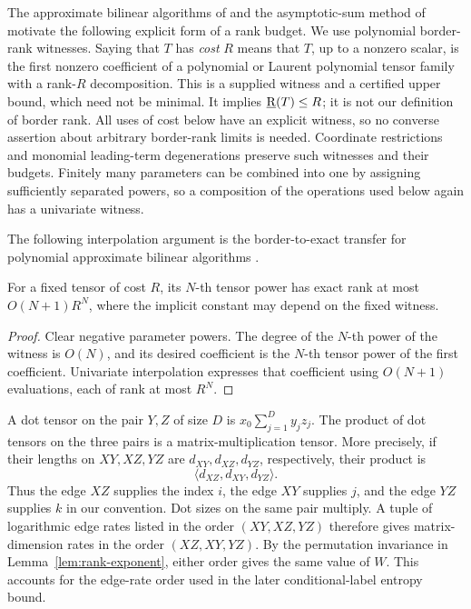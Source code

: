 The approximate bilinear algorithms of \citet{bini} and the
asymptotic-sum method of \citet{schonhage} motivate the following
explicit form of a rank budget.  We use polynomial border-rank witnesses.
Saying that \(T\) has \emph{cost} \(R\) means that \(T\), up to a nonzero
scalar, is the first nonzero coefficient of a polynomial or Laurent
polynomial tensor family with a rank-\(R\) decomposition.
This is a supplied witness and a certified upper bound, which need not
be minimal.  It implies \(\operatorname{\underline R}(T)\le R\); it is not our definition of
border rank.  All uses of cost below have an explicit witness, so no
converse assertion about arbitrary border-rank limits is needed.
Coordinate restrictions and monomial leading-term degenerations preserve
such witnesses and their budgets.  Finitely many parameters can be
combined into one by assigning sufficiently separated powers, so a
composition of the operations used below again has a univariate witness.

The following interpolation argument is the border-to-exact transfer
for polynomial approximate bilinear algorithms \cite{bini}.

\begin{lemma}\label{lem:border-overhead}
For a fixed tensor of cost \(R\), its \(N\)-th tensor power has exact
rank at most \(O(N+1)R^N\), where the implicit constant may depend on
the fixed witness.
\end{lemma}

\begin{proof}
Clear negative parameter powers.
The degree of the \(N\)-th power of the witness is \(O(N)\), and its
desired coefficient is the \(N\)-th tensor power of the first
coefficient.  Univariate interpolation expresses that coefficient using
\(O(N+1)\) evaluations, each of rank at most \(R^N\).
\end{proof}

A dot tensor on the pair \(Y,Z\) of size \(D\) is
\(x_0\sum_{j=1}^D y_jz_j\).
The product of dot tensors on the three pairs is a matrix-multiplication
tensor.  More precisely, if their lengths on \(XY,XZ,YZ\) are
\(d_{XY},d_{XZ},d_{YZ}\), respectively, their product is
\[
 \langle d_{XZ},d_{XY},d_{YZ}\rangle.
\]
Thus the edge \(XZ\) supplies the index \(i\), the edge \(XY\)
supplies \(j\), and the edge \(YZ\) supplies \(k\) in our convention.
Dot sizes on the same pair multiply.  A tuple of logarithmic edge rates
listed in the order \((XY,XZ,YZ)\) therefore gives matrix-dimension
rates in the order \((XZ,XY,YZ)\).  By the permutation invariance in
Lemma~\ref{lem:rank-exponent}, either order gives the same value of
\(W\).  This accounts for the edge-rate order used in the later
conditional-label entropy bound.

